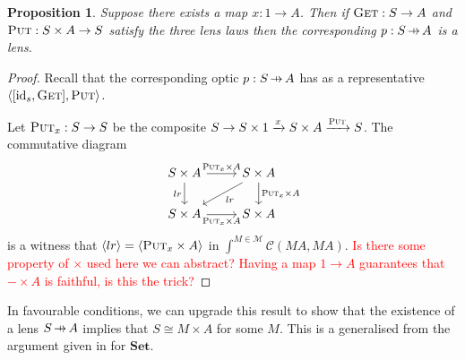 \documentclass[11pt,a4paper]{article}
\theoremstyle{plain}
\newtheorem{proposition}[theorem]{Proposition}
\theoremstyle{definition}
\newcommand{\C}{\mathscr{C}}
\newcommand{\M}{\mathscr{M}}
\newcommand{\Set}{\mathbf{Set}}
\newcommand{\id}{\mathrm{id}}
\newcommand{\fget}{\textsc{Get}}
\newcommand{\fput}{\textsc{Put}}
\newcommand{\hto}{\ensuremath{\,\mathaccent\shortmid\rightarrow\,}}
\newcommand{\todo}[1]{\textcolor{red}{\small #1}}
\begin{document}
\begin{proposition}
Suppose there exists a map $x : 1 \to A$. Then if $\fget : S \to A$ and $\fput : S \times A \to S$ satisfy the three lens laws then the corresponding $p : S \hto A$ is a lens.
\end{proposition}
\begin{proof}
Recall that the corresponding optic $p : S \hto A$ has as a representative $\langle [\id_s, \fget], \fput \rangle$.

Let $\fput_x : S \to S$ be the composite $S \to S \times 1 \xrightarrow{x} S \times A \xrightarrow{\fput} S$. The commutative diagram
\[
\begin{tikzcd}
S \times A \ar[r, "\fput_x \times A "] \ar[d, "lr", swap] & S \times A \ar[d, "\fput_x \times A"] \ar[dl, "lr"] \\
S \times A \ar[r, "\fput_x \times A", swap] & S \times A
\end{tikzcd}
\]
is a witness that $\langle lr \rangle = \langle \fput_x \times A \rangle$ in $\int^{M \in \M} \C(M A, M A)$.
\todo{Is there some property of $\times$ used here we can abstract? Having a map $1 \to A$ guarantees that $- \times A$ is faithful, is this the trick?}
\end{proof}

In favourable conditions, we can upgrade this result to show that the existence of a lens $S \hto A$ implies that $S \cong M \times A$ for some $M$. This is a generalised from the argument given in \cite[Corollary 13]{AlgebrasAndUpdateStrategies} for $\Set$.
\end{document}
